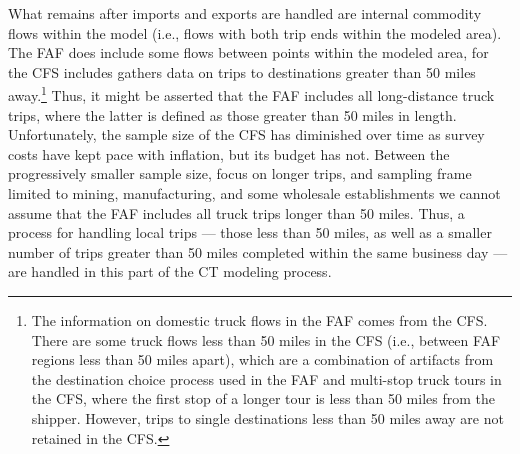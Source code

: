 What remains after imports and exports are handled are internal commodity flows within the model (i.e., flows with both trip ends within the modeled area). The FAF does include some flows between points within the modeled area, for the CFS includes gathers data on trips to destinations greater than 50 miles away.\footnote{The information on domestic truck flows in the FAF comes from the CFS. There are some truck flows less than 50 miles in the CFS (i.e., between FAF regions less than 50 miles apart), which are a combination of artifacts from the destination choice process used in the FAF and multi-stop truck tours in the CFS, where the first stop of a longer tour is less than 50 miles from the shipper. However, trips to single destinations less than 50 miles away are not retained in the CFS.} Thus, it might be asserted that the FAF includes all long-distance truck trips, where the latter is defined as those greater than 50 miles in length. Unfortunately, the sample size of the CFS has diminished over time as survey costs have kept pace with inflation, but its budget has not. Between the progressively smaller sample size, focus on longer trips, and sampling frame limited to mining, manufacturing, and some wholesale establishments we cannot assume that the FAF includes all truck trips longer than 50 miles. Thus, a process for handling local trips --- those less than 50 miles, as well as a smaller number of trips greater than 50 miles completed within the same business day --- are handled in this part of the CT modeling process.

